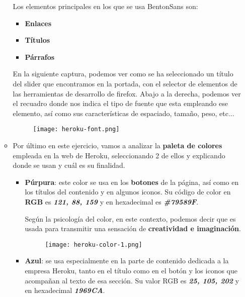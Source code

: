 \begin{enumerate}[label=\alph*)]
\begin{itemize}
        Los elementos principales en los que se usa BentonSans son:
        \begin{itemize}
            \item \textbf{Enlaces}
            \item \textbf{Títulos}
            \item \textbf{Párrafos}
        \end{itemize}

        En la siguiente captura, podemos ver como se ha seleccionado un título del slider que encontramos en la portada, con el selector de elementos de las herramientas de desarrollo de firefox. Abajo a la derecha, podemos ver el recuadro donde nos indica el tipo de fuente que esta empleando ese elemento, así como sus características de espaciado, tamaño, peso, etc...

        \begin{figure}[H]
            \centering
            \texttt{[image: heroku-font.png]}
        \end{figure}

        \item  Por último en este ejercicio, vamos a analizar la \textbf{paleta de colores} empleada en la web de Heroku, seleccionando 2 de ellos y explicando donde se usan y cuál es su finalidad.
        \begin{itemize}
            \item \textbf{Púrpura}: este color se usa en los \textbf{botones} de la página, así como en los títulos del contenido y en algunos iconos. Su código de color en \textbf{RGB} es \textbf{\textit{121, 88, 159}} y en hexadecimal es \textbf{\textit{\#79589F}}.

            Según la psicología del color, en este contexto, podemos decir que es usada para transmitir una sensación de \textbf{creatividad e imaginación}.

            \begin{figure}[H]
                \centering
                \texttt{[image: heroku-color-1.png]}
            \end{figure}

            \item \textbf{Azul}: se usa especialmente en la parte de contenido dedicada a la empresa Heroku, tanto en el título como en el botón y los iconos que acompañan al texto de esa sección. Su valor RGB es \textbf{\textit{25, 105, 202}} y en hexadecimal \textbf{\textit{1969CA}}.


\end{itemize}
\end{itemize}
\end{enumerate}
